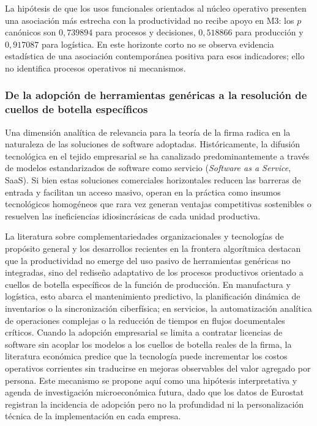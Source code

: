 \documentclass[12pt,a4paper]{article}
\begin{document}
La hipótesis de que los usos funcionales orientados al núcleo operativo presenten una asociación más estrecha con la productividad no recibe apoyo en M3: los $p$ canónicos son $0,739894$ para procesos y decisiones, $0,518866$ para producción y $0,917087$ para logística. En este horizonte corto no se observa evidencia estadística de una asociación contemporánea positiva para esos indicadores; ello no identifica procesos operativos ni mecanismos.

\subsubsection{De la adopción de herramientas genéricas a la resolución de cuellos de botella específicos}

Una dimensión analítica de relevancia para la teoría de la firma radica en la naturaleza de las soluciones de software adoptadas. Históricamente, la difusión tecnológica en el tejido empresarial se ha canalizado predominantemente a través de modelos estandarizados de software como servicio (\textit{Software as a Service}, SaaS). Si bien estas soluciones comerciales horizontales reducen las barreras de entrada y facilitan un acceso masivo, operan en la práctica como insumos tecnológicos homogéneos que rara vez generan ventajas competitivas sostenibles o resuelven las ineficiencias idiosincrásicas de cada unidad productiva.

La literatura sobre complementariedades organizacionales y tecnologías de propósito general \citep{bresnahan2002information} y los desarrollos recientes en la frontera algorítmica destacan que la productividad no emerge del uso pasivo de herramientas genéricas no integradas, sino del rediseño adaptativo de los procesos productivos orientado a cuellos de botella específicos de la función de producción. En manufactura y logística, esto abarca el mantenimiento predictivo, la planificación dinámica de inventarios o la sincronización ciberfísica; en servicios, la automatización analítica de operaciones complejas o la reducción de tiempos en flujos documentales críticos. Cuando la adopción empresarial se limita a contratar licencias de software sin acoplar los modelos a los cuellos de botella reales de la firma, la literatura económica predice que la tecnología puede incrementar los costos operativos corrientes sin traducirse en mejoras observables del valor agregado por persona. Este mecanismo se propone aquí como una hipótesis interpretativa y agenda de investigación microeconómica futura, dado que los datos de Eurostat registran la incidencia de adopción pero no la profundidad ni la personalización técnica de la implementación en cada empresa.
\end{document}

